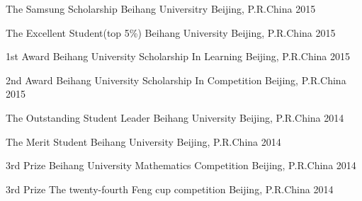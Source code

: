 \begin{cvhonors}


\cvhonor
{The Samsung Scholarship} %
{Beihang Universitry} %
{Beijing, P.R.China} %
{2015} %


\cvhonor
{The Excellent Student(top 5\%)} %
{Beihang University} %
{Beijing, P.R.China} %
{2015} %


\cvhonor
{1st Award} %
{Beihang University Scholarship In Learning}%
{Beijing, P.R.China} %
{2015} %


\cvhonor
{2nd Award} %
{Beihang University Scholarship In Competition} %
{Beijing, P.R.China} %
{2015} %



\cvhonor
{The Outstanding Student Leader} %
{Beihang University} %
{Beijing, P.R.China} %
{2014} %


\cvhonor
{The Merit Student} %
{Beihang University} %
{Beijing, P.R.China} %
{2014} %


\cvhonor
{3rd Prize}
{Beihang University Mathematics Competition}
{Beijing, P.R.China}
{2014}


\cvhonor
{3rd Prize} %
{The twenty-fourth Feng cup competition} %
{Beijing, P.R.China} %
{2014} %


\end{cvhonors}